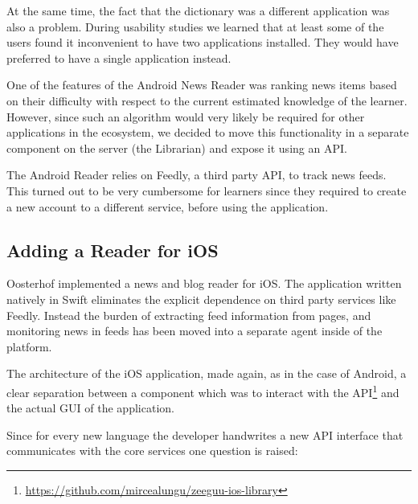 At the same time, the fact that the dictionary was a different application was also a problem. During usability studies we learned that at least some of the users found it inconvenient to have two applications installed. They would have preferred to have a single application instead. 



One of the features of the Android News Reader was ranking news items based on their difficulty with respect to the current estimated knowledge of the learner. However, since such an algorithm would very likely be required for other applications in the ecosystem, we decided to move this functionality in a separate component on the server (the Librarian) and expose it using an API. 


The Android Reader relies on Feedly, a third party API, to track news feeds. This turned out to be very cumbersome for learners since they required to create a new account to a different service, before using the application.


\subsection {Adding a Reader for iOS}

Oosterhof \cite{Oost16reading} implemented a news and blog reader for iOS. The application written natively in Swift eliminates the explicit dependence on third party services like Feedly. Instead the burden of extracting feed information from pages, and monitoring news in feeds has been moved into a separate agent inside of the platform. 

The architecture of the iOS application, made again, as in the case of Android, a clear separation between a component which was to interact with the API\footnote{\url{https://github.com/mircealungu/zeeguu-ios-library}} and the actual GUI of the application. 

Since for every new language the developer handwrites a new API interface that communicates with the core services one question is raised:

